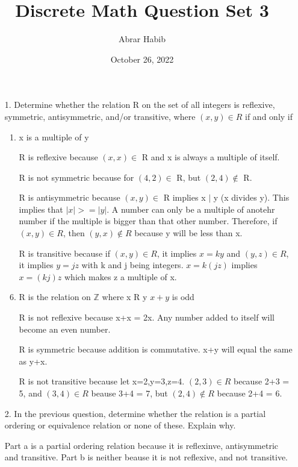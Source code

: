 \documentclass[letterpaper,11pt]{article}
\begin{document}
\title{Discrete Math Question Set 3}
\author{Abrar Habib}
\date{October 26, 2022}
\maketitle


\begin{enumerate}
    \item [1.] Determine whether the relation R on the set of all integers is reflexive, symmetric, antisymmetric, and/or
    transitive, where $(x, y) \in R$ if and only if
    \begin{enumerate}
        \item x is a multiple of y
        \item[] R is reflexive because $(x,x) \in$ R and x is always a multiple of itself.
        \item[] R is not symmetric because for $(4,2) \in$ R, but $(2,4) \notin$ R. 
        \item[] R is antisymmetric because $(x,y) \in$ R implies x $\vert$ y (x divides y). This implies that $\left\lvert x \right\rvert >= \left\lvert y \right\rvert$. A number can only be a multiple of anotehr number if the multiple is bigger than that other number. Therefore, if $(x,y) \in R$, then $(y,x) \notin R$ because y will be less than x.
        \item[] R is transitive because if $(x,y) \in R$, it implies $x=ky$ and $(y,z) \in R$, it implies $y=jz$ with k and j being integers. $x=k(jz)$ implies $x=(kj)z$ which makes z a multiple of x.  
        \item R is the relation on $\mathbb{Z}$ where x R y $x + y$ is odd
        \item[] R is not reflexive because x+x = 2x. Any number added to itself will become an even number.
        \item[] R is symmetric because addition is commutative. x+y will equal the same as y+x. 
        \item[] R is not transitive because let x=2,y=3,z=4. $(2,3) \in R$ because 2+3 = 5, and $(3,4) \in R$ beause 3+4 = 7, but $(2,4) \notin R$ because 2+4 = 6.
    \end{enumerate}
    \item[2.] In the previous question, determine whether the relation is a partial ordering or equivalence relation or
    none of these. Explain why.
    \item[] Part a is a partial ordering relation because it is reflexinve, antisymmetric and transitive. Part b is neither beause it is not reflexive, and not transitive.

\end{enumerate}
\end{document}

